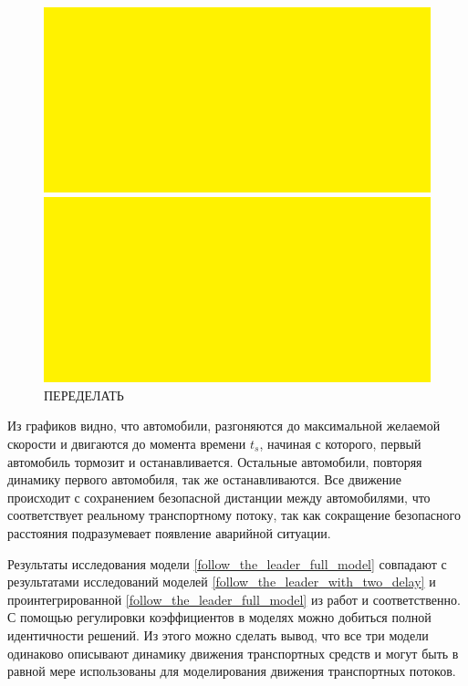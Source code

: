 \documentclass[12pt, a4paper]{extarticle}
\numberwithin{equation}{section}
\begin{document}
\begin{figure}[h!]
	\begin{center}
		\begin{minipage}[h!]{0.48\linewidth}
			\includegraphics[width=1\linewidth,height=0.2\textheight]
			{Images/test.png}
		\end{minipage}
		\hfill 
		\begin{minipage}[h!]{0.48\linewidth}
			\includegraphics[width=1\linewidth,height=0.2\textheight]
			{Images/test.png}
		\end{minipage}
		\caption{ПЕРЕДЕЛАТЬ}
		\label{follow_the_leader}
	\end{center}
\end{figure}

Из графиков видно, что автомобили, разгоняются до максимальной желаемой скорости и двигаются до момента времени $t_s$, начиная с которого, первый автомобиль тормозит и останавливается. Остальные автомобили, повторяя динамику первого автомобиля, так же останавливаются. Все движение происходит с сохранением безопасной дистанции между автомобилями, что соответствует реальному транспортному потоку, так как сокращение безопасного расстояния подразумевает появление аварийной ситуации.

Результаты исследования модели \eqref{follow_the_leader_full_model} совпадают с  результатами исследований моделей \eqref{follow_the_leader_with_two_delay} и проинтегрированной \eqref{follow_the_leader_full_model} из работ \cite{RefineFirstFollowTheLeaderModel} и \cite{Course} соответственно. С помощью регулировки коэффициентов в моделях можно добиться полной идентичности решений. Из этого можно сделать вывод, что все три модели одинаково описывают динамику движения транспортных средств и могут быть в равной мере использованы для моделирования движения транспортных потоков.
\end{document}
